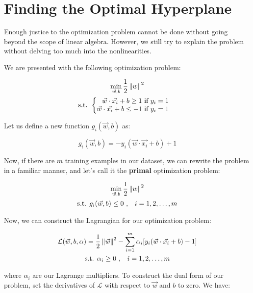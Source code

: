 \section{Finding the Optimal Hyperplane}

Enough justice to the optimization problem cannot be done without going beyond the scope of linear algebra. However, we still try to explain the problem without delving too much into the nonlinearities.

We are presented with the following optimization problem:

\begin{gather}
	\min_{\vec{w}, b} \frac{1}{2}\left\lVert w\right\rVert^2 \nonumber\\
	\text{s.t. }
	\begin{cases}
	\begin{aligned}
		\vec{w}\cdot\vec{x_i} + b \geq 1 \text{ if $y_i = 1$} \nonumber\\
		\vec{w}\cdot\vec{x_i} + b \leq -1 \text{ if $y_i = 1$} \nonumber
	\end{aligned}
	\end{cases}
\end{gather}

Let us define a new function $g_i(\vec{w}, b)$ as:

\begin{equation}
	g_i(\vec{w}, b) = -y_i(\vec{w}\cdot\vec{x_i} + b) + 1
\end{equation}

Now, if there are $m$ training examples in our dataset, we can rewrite the problem in a familiar manner, and let's call it the \textbf{primal} optimization problem:

\begin{gather}
	\min_{\vec{w}, b} \frac{1}{2}\left\lVert w\right\rVert^2 \nonumber\\
	\text{s.t. }
	g_i(\vec{w}, b)  \leq 0 \text{ ,}\quad\text{$i = 1, 2, \dots , m$}\nonumber
\end{gather}

Now, we can construct the Lagrangian for our optimization problem:

\begin{gather}
\mathcal{L}(\vec{w}, b, \alpha) = \frac{1}{2}\left\lVert\vec{w}\right\rVert^2 - \sum_{i = 1}^{m}\alpha_i[y_i(\vec{w}\cdot\vec{x_i} + b) - 1] \label{eq:lag} \\
\text{s.t. } \alpha_{i} \geq 0\text{ ,}\quad\text{$i = 1, 2, \dots , m$}\nonumber
\end{gather}

where $\alpha_i$ are our Lagrange multipliers. To construct the dual form of our problem, set the derivatives of $\mathcal{L}$ with respect to $\vec{w}$ and $b$ to zero. We have:

